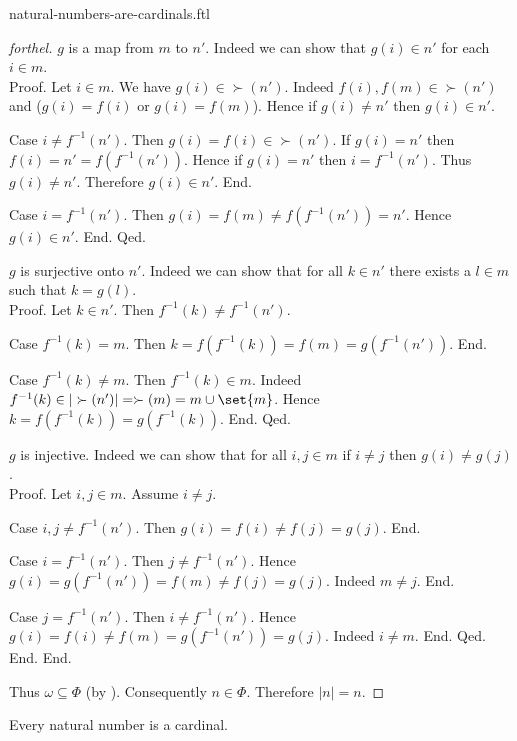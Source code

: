 \documentclass{naproche-library}
\begin{document}
\begin{smodule}{natural-numbers-are-cardinals.ftl}
\begin{proof}[forthel]
        $g$ is a map from $m$ to $n'$.
        Indeed we can show that $g(i) \in n'$ for each $i \in m$. \\
        Proof.
          Let $i \in m$.
          We have $g(i) \in \succ(n')$.
          Indeed $f(i), f(m) \in \succ(n')$ and ($g(i) = f(i)$ or $g(i) = f(m)$).
          Hence if $g(i) \neq n'$ then $g(i) \in n'$.

          Case $i \neq f^{-1}(n')$.
            Then $g(i) = f(i) \in \succ(n')$.
            If $g(i) = n'$ then $f(i) = n' = f(f^{-1}(n'))$.
            Hence if $g(i) = n'$ then $i = f^{-1}(n')$.
            Thus $g(i) \neq n'$.
            Therefore $g(i) \in n'$.
          End.

          Case $i = f^{-1}(n')$.
            Then $g(i)
              = f(m)
              \neq f(f^{-1}(n'))
              = n'$.
            Hence $g(i) \in n'$.
          End.
        Qed.

        $g$ is surjective onto $n'$.
        Indeed we can show that for all $k \in n'$ there exists a $l \in m$ such that $k = g(l)$. \\
        Proof.
          Let $k \in n'$.
          Then $f^{-1}(k) \neq f^{-1}(n')$.

          Case $f^{-1}(k) = m$.
            Then $k
              = f(f^{-1}(k))
              = f(m)
              = g(f^{-1}(n'))$.
          End.

          Case $f^{-1}(k) \neq m$.
            Then $f^{-1}(k) \in m$.
            Indeed $f^{-1}(k) \in |\succ(n')| = \succ(m) = m \cup \set{m}$.
            Hence $k
              = f(f^{-1}(k))
              = g(f^{-1}(k))$.
          End.
        Qed.

        $g$ is injective.
        Indeed we can show that for all $i, j \in m$ if $i \neq j$ then $g(i) \neq g(j)$. \\
        Proof.
          Let $i, j \in m$.
          Assume $i \neq j$.

          Case $i, j \neq f^{-1}(n')$.
            Then $g(i)
              = f(i)
              \neq f(j)
              = g(j)$.
          End.

          Case $i = f^{-1}(n')$.
            Then $j \neq f^{-1}(n')$.
            Hence $g(i)
              = g(f^{-1}(n'))
              = f(m)
              \neq f(j)
              = g(j)$.
            Indeed $m \neq j$.
          End.

          Case $j = f^{-1}(n')$.
            Then $i \neq f^{-1}(n')$.
            Hence $g(i)
              = f(i)
              \neq f(m)
              = g(f^{-1}(n'))
              = g(j)$.
            Indeed $i \neq m$.
          End.
        Qed.
      End.
    End.

    Thus $\omega \subseteq \Phi$ (by ).
    Consequently $n \in \Phi$.
    Therefore $|n| = n$.
  \end{proof}

  \begin{corollary}[forthel,id=SET_THEORY_07_7061392098066432,printid]
    Every natural number is a cardinal.
  \end{corollary}
\end{smodule}
\end{document}
